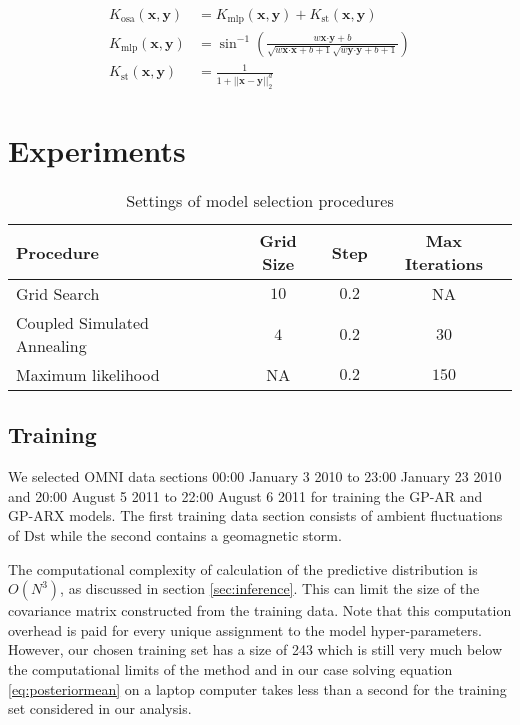 \begin{align}
    K_{\text{osa}}(\mathbf{x}, \mathbf{y}) & = K_{\text{mlp}}(\mathbf{x}, \mathbf{y}) + K_{\text{st}}(\mathbf{x}, \mathbf{y}) \label{eq:usedKernel} \\
    K_{\text{mlp}}(\mathbf{x}, \mathbf{y}) & = \sin^{-1}\left(\frac{w\mathbf{x}\boldsymbol{\cdot} \mathbf{y} + b}{\sqrt{w\mathbf{x}\boldsymbol{\cdot} \mathbf{x} + b + 1} \sqrt{w\mathbf{y}\boldsymbol{\cdot} \mathbf{y} + b + 1}}\right) \\
    K_{\text{st}}(\mathbf{x}, \mathbf{y}) & = \frac{1}{1 + ||\mathbf{x} - \mathbf{y}||_{2}^d}
\end{align}

\section{Experiments} \label{sec:modeltraining}

\begin{table}[h]
    \centering
    \caption{Settings of model selection procedures}
    \begin{tabular}{l c c c}
    \hline
    \textbf{Procedure} & \textbf{Grid Size} & \textbf{Step} & \textbf{Max Iterations} \\
    \hline
    Grid Search & $10$ & $0.2$ & NA \\
    Coupled Simulated Annealing & $4$ & $0.2$ & $30$ \\
    Maximum likelihood & NA & $0.2$ & $150$\\
    \hline
    \end{tabular}
    \label{table:modelselection}
\end{table}

\subsection*{Training}

We selected OMNI data sections 00:00 January 3 2010 to 23:00 January 23 2010 and 20:00 August 5 2011 to 22:00 August 6 2011 for training the GP-AR and GP-ARX models. The first training data section consists of ambient fluctuations of $ \mathrm{Dst}$ while the second contains a geomagnetic storm.

The computational complexity of calculation of the predictive distribution is $O(N^3)$, as discussed in section \ref{sec:inference}. This can limit the size of the covariance matrix constructed from the training data. Note that this computation overhead is paid for every unique assignment to the model hyper-parameters. However, our chosen training set has a size of 243 which is still very much below the computational limits of the method and in our case solving equation \ref{eq:posteriormean} on a laptop computer takes less than a second for the training set considered in our analysis. 

